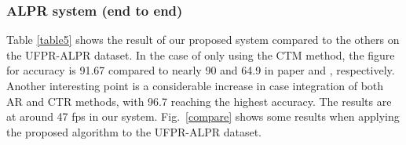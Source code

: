 \documentclass[conference]{IEEEtran}
\begin{document}
\subsubsection{ALPR system (end to end)}
Table \ref{table5} shows the result of our proposed system compared to the others on the UFPR-ALPR dataset. In the case of only using the CTM method, the figure for accuracy is 91.67 compared to nearly 90 and 64.9 in paper \cite{layout} and \cite{ufpr}, respectively. Another interesting point is a considerable increase in case integration of both AR and CTR methods, with 96.7 reaching the highest accuracy. The results are at around 47 fps in our system. Fig.~\ref{compare} shows some results when applying the proposed algorithm to the UFPR-ALPR dataset.



\begin{table}[h!]

\centering
\caption{The accuracy of ALPR system.}
\end{table}
\end{document}
